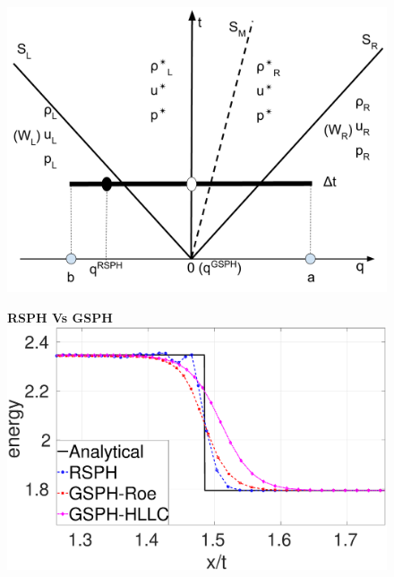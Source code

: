 \documentclass[oneside,11pt]{memoir}
\begin{document}
\begin{vplace}[0.7]

\begin{figure}[htp]
    \centering
    \begin{minipage}[b][][b]{.495\textwidth}
        \centering
        \includegraphics[width=0.99 \textwidth]{./Figures/RSPH-GSPH}
    \end{minipage}%
    \begin{minipage}[b][][b]{.495 \textwidth}
        \centering \textbf{RSPH Vs GSPH}
        \includegraphics[width=0.99 \textwidth]{./Figures/Sod/RCM-Sod-GSPH-compare-e-zoom2}
    \end{minipage}%
\end{figure}


\end{vplace}
\end{document}
